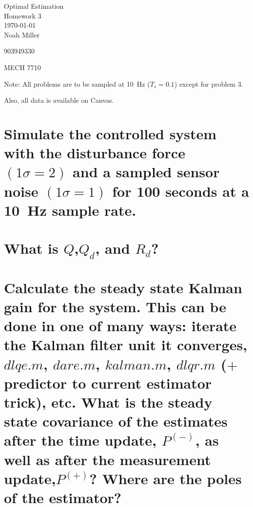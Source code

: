 \documentclass[12pt,letterpaper, onecolumn]{exam}
\begin{document}
\begingroup
\centering
\LARGE Optimal Estimation\\
\LARGE Homework 3 \\[0.5em]
\large \today\\[0.5em]
\large Noah Miller\par
\large 903949330\par
\large MECH 7710\par
\endgroup
\pointsdroppedatright   %
\printanswers
\renewcommand{\solution}{\noindent\textbf{Ans:}\enspace}   %
\vspace{.5cm}

\noindent Note: All problems are to be sampled at 10~Hz ($T_s = 0.1$) except for problem 3.

\noindent Also, all data is available on Canvas.
\begin{questions}
    \begin{parts}
        \part{Simulate the controlled system with the disturbance force $\left(1\sigma = 2\right)$ and a sampled sensor noise $\left(1\sigma = 1\right)$ for 100 seconds at a 10~Hz sample rate.}

        \part{What is $Q$,$Q_d$, and $R_d$?}

        \part{Calculate the steady state Kalman gain for the system. This can be done in one of many ways: iterate the Kalman filter unit it converges, $dlqe.m$, $dare.m$, $kalman.m$, $dlqr.m$ ($+$ predictor to current estimator trick), etc.
            What is the steady state covariance of the estimates after the time update, $P^{(-)}$, as well as after the measurement update,$P^{(+)}$? Where are the poles of the estimator?}


\end{parts}
\end{questions}
\end{document}
